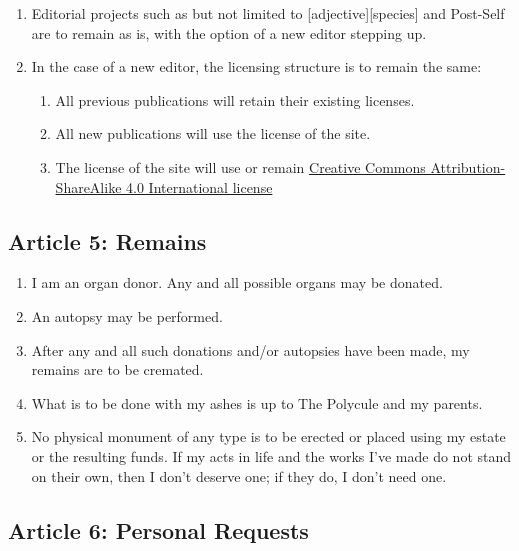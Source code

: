 \documentclass[oneside]{memoir}
\begin{document}
\begin{enumerate}
\def\labelenumi{\arabic{enumi}.}
\tightlist
\item
  Editorial projects such as but not limited to {[}adjective{]}{[}species{]} and Post-Self are to remain as is, with the option of a new editor stepping up.
\item
  In the case of a new editor, the licensing structure is to remain the same:

  \begin{enumerate}
  \def\labelenumii{\arabic{enumii}.}
  \tightlist
  \item
    All previous publications will retain their existing licenses.
  \item
    All new publications will use the license of the site.
  \item
    The license of the site will use or remain \href{https://creativecommons.org/licenses/by-sa/4.0/}{Creative Commons Attribution-ShareAlike 4.0 International license}
  \end{enumerate}
\end{enumerate}

\subsection*{Article 5: Remains}\label{article-5-remains}

\begin{enumerate}
\def\labelenumi{\arabic{enumi}.}
\tightlist
\item
  I am an organ donor. Any and all possible organs may be donated.
\item
  An autopsy may be performed.
\item
  After any and all such donations and/or autopsies have been made, my remains are to be cremated.
\item
  What is to be done with my ashes is up to The Polycule and my parents.
\item
  No physical monument of any type is to be erected or placed using my estate or the resulting funds. If my acts in life and the works I've made do not stand on their own, then I don't deserve one; if they do, I don't need one.
\end{enumerate}

\subsection*{Article 6: Personal Requests}\label{article-6-personal-requests}
\end{document}
